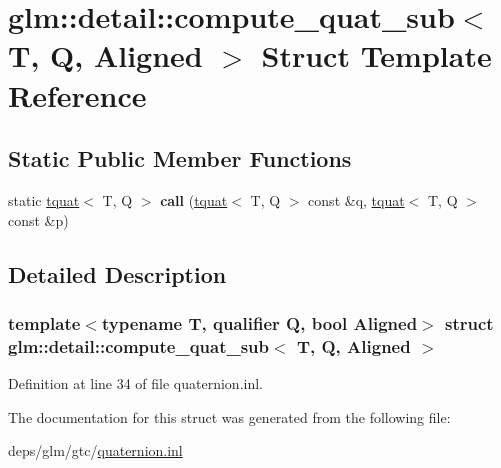 \hypertarget{structglm_1_1detail_1_1compute__quat__sub}{}\section{glm\+:\+:detail\+:\+:compute\+\_\+quat\+\_\+sub$<$ T, Q, Aligned $>$ Struct Template Reference}
\label{structglm_1_1detail_1_1compute__quat__sub}
\subsection*{Static Public Member Functions}
\begin{DoxyCompactItemize}
\item 
\mbox{\label{structglm_1_1detail_1_1compute__quat__sub_ac0bcb0d1dd7a6392e90d50328f304cdf}} 
static \hyperlink{structglm_1_1tquat}{tquat}$<$ T, Q $>$ {\bfseries call} (\hyperlink{structglm_1_1tquat}{tquat}$<$ T, Q $>$ const \&q, \hyperlink{structglm_1_1tquat}{tquat}$<$ T, Q $>$ const \&p)
\end{DoxyCompactItemize}


\subsection{Detailed Description}
\subsubsection*{template$<$typename T, qualifier Q, bool Aligned$>$\newline
struct glm\+::detail\+::compute\+\_\+quat\+\_\+sub$<$ T, Q, Aligned $>$}



Definition at line 34 of file quaternion.\+inl.



The documentation for this struct was generated from the following file\+:\begin{DoxyCompactItemize}
\item 
deps/glm/gtc/\hyperlink{gtc_2quaternion_8inl}{quaternion.\+inl}\end{DoxyCompactItemize}
